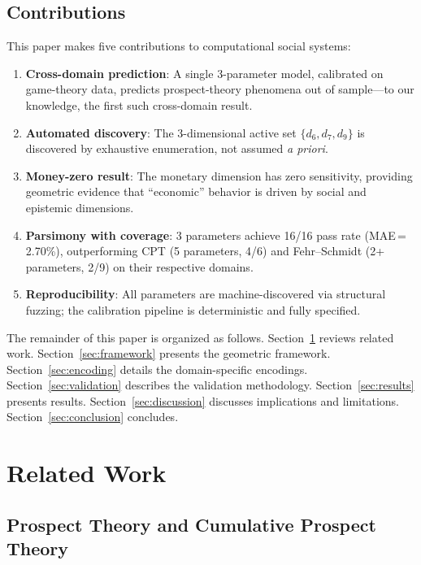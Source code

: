 \documentclass[journal]{IEEEtran}
\begin{document}
\subsection{Contributions}
This paper makes five contributions to computational social systems:
\begin{enumerate}
    \item \textbf{Cross-domain prediction}: A single 3-parameter model, calibrated on game-theory data, predicts prospect-theory phenomena out of sample---to our knowledge, the first such cross-domain result.
    \item \textbf{Automated discovery}: The 3-dimensional active set $\{d_6, d_7, d_9\}$ is discovered by exhaustive enumeration, not assumed \emph{a priori}.
    \item \textbf{Money-zero result}: The monetary dimension has zero sensitivity, providing geometric evidence that ``economic'' behavior is driven by social and epistemic dimensions.
    \item \textbf{Parsimony with coverage}: 3 parameters achieve 16/16 pass rate (MAE\,=\,2.70\%), outperforming CPT (5 parameters, 4/6) and Fehr--Schmidt (2+ parameters, 2/9) on their respective domains.
    \item \textbf{Reproducibility}: All parameters are machine-discovered via structural fuzzing; the calibration pipeline is deterministic and fully specified.
\end{enumerate}

The remainder of this paper is organized as follows.
Section~\ref{sec:related} reviews related work.
Section~\ref{sec:framework} presents the geometric framework.
Section~\ref{sec:encoding} details the domain-specific encodings.
Section~\ref{sec:validation} describes the validation methodology.
Section~\ref{sec:results} presents results.
Section~\ref{sec:discussion} discusses implications and limitations.
Section~\ref{sec:conclusion} concludes.


\section{Related Work}
\label{sec:related}

\subsection{Prospect Theory and Cumulative Prospect Theory}
\end{document}
